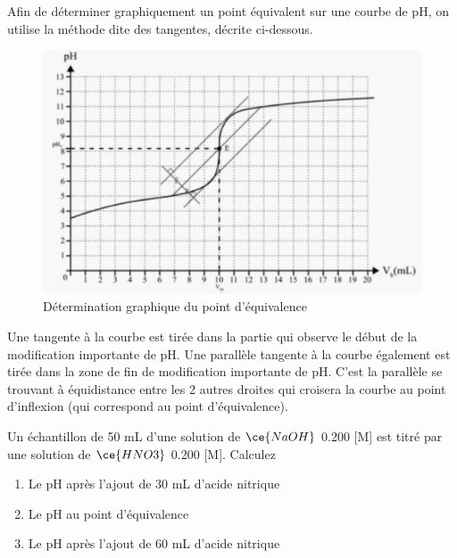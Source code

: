 \documentclass[
  11pt,
  a4paper,
  openany]{book}
\providecommand{\tightlist}{%
  \setlength{\itemsep}{0pt}\setlength{\parskip}{0pt}}
\begin{document}
Afin de déterminer graphiquement un point équivalent sur une courbe de pH, on utilise la méthode dite des tangentes, décrite ci-dessous.

\begin{figure}

{\centering \includegraphics[width=0.75\linewidth]{images/acides-bases-7} 

}

\caption{Détermination graphique du point d'équivalence}\label{fig:acides-bases-7}
\end{figure}

Une tangente à la courbe est tirée dans la partie qui observe le début de la modification importante de pH. Une parallèle tangente à la courbe également est tirée dans la zone de fin de modification importante de pH. C'est la parallèle se trouvant à équidistance entre les 2 autres droites qui croisera la courbe au point d'inflexion (qui correspond au point d'équivalence).

\clearpage

\begin{Exercise}

Un échantillon de 50 mL d'une solution de \(\ce{NaOH}\) 0.200 {[}M{]} est titré par une solution de \(\ce{HNO3}\) 0.200 {[}M{]}. Calculez

\begin{enumerate}
\def\labelenumi{\alph{enumi}.}
\tightlist
\item
  Le pH après l'ajout de 30 mL d'acide nitrique
\item
  Le pH au point d'équivalence
\item
  Le pH après l'ajout de 60 mL d'acide nitrique
\end{enumerate}

\end{Exercise}
\end{document}
